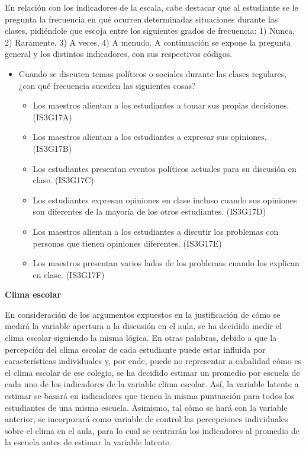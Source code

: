 \documentclass[12pt,twoside]{templates/facsothesis}
\providecommand{\tightlist}{%
  \setlength{\itemsep}{0pt}\setlength{\parskip}{0pt}}
\begin{document}
En relación con los indicadores de la escala, cabe destacar que al estudiante se le pregunta la frecuencia en qué ocurren determinadas situaciones durante las clases, pidiéndole que escoja entre los siguientes grados de frecuencia: 1) Nunca, 2) Raramente, 3) A veces, 4) A menudo. A continuación se expone la pregunta general y los distintos indicadores, con sus respectivos códigos.

\begin{itemize}
\item
  Cuando se discuten temas políticos o sociales durante las clases regulares, ¿con qué frecuencia suceden las siguientes cosas?

  \begin{itemize}
  \tightlist
  \item
    Los maestros alientan a los estudiantes a tomar sus propias decisiones. (IS3G17A)
  \item
    Los maestros alientan a los estudiantes a expresar sus opiniones. (IS3G17B)
  \item
    Los estudiantes presentan eventos políticos actuales para su discusión en clase. (IS3G17C)
  \item
    Los estudiantes expresan opiniones en clase incluso cuando sus opiniones son diferentes de la mayoría de los otros estudiantes. (IS3G17D)
  \item
    Los maestros alientan a los estudiantes a discutir los problemas con personas que tienen opiniones diferentes. (IS3G17E)
  \item
    Los maestros presentan varios lados de los problemas cuando los explican en clase. (IS3G17F)
  \end{itemize}
\end{itemize}

\textbf{Clima escolar}

En consideración de los argumentos expuestos en la justificación de cómo se medirá la variable apertura a la discusión en el aula, se ha decidido medir el clima escolar siguiendo la misma lógica. En otras palabras, debido a que la percepción del clima escolar de cada estudiante puede estar influida por características individuales y, por ende, puede no representar a cabalidad cómo es el clima escolar de ese colegio, se ha decidido estimar un promedio por escuela de cada uno de los indicadores de la variable clima escolar. Así, la variable latente a estimar se basará en indicadores que tienen la misma puntuación para todos los estudiantes de una misma escuela. Asimismo, tal cómo se hará con la variable anterior, se incorporará como variable de control las percepciones individuales sobre el clima en el aula, para lo cual se centrarán los indicadores al promedio de la escuela antes de estimar la variable latente.
\end{document}
